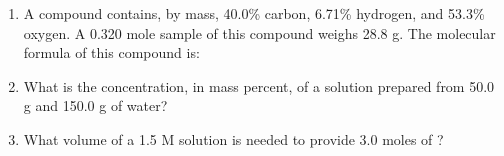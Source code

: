 \documentclass[main.tex]{subfiles}
\begin{document}
\begin{fullwidth}
\begin{multicols*}{2}
\begin{enumerate}
\item A compound contains, by mass, 40.0\% carbon, 6.71\% hydrogen, and 53.3\% oxygen. A 0.320 mole sample of this compound weighs 28.8 g. The molecular formula of this compound is:
\begin{enumerate}[label=(\alph*)]\vspace{-0.5cm}
\end{enumerate}\vspace{-0.5cm}

\item What is the concentration, in mass percent, of a solution prepared from 50.0 g  and 150.0 g of water? 
\begin{enumerate}[label=(\alph*)]\vspace{-0.5cm}
\end{enumerate}\vspace{-0.5cm}

\item What volume of a 1.5 M  solution is needed to provide 3.0 moles of ?
\begin{enumerate}[label=(\alph*)]\vspace{-0.5cm}
\end{enumerate}\vspace{-0.5cm}


\end{enumerate}
\end{multicols*}
\end{fullwidth}
\end{document}
